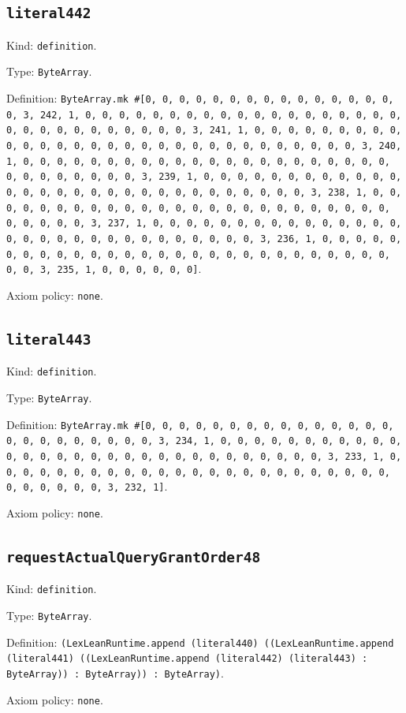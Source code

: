 \documentclass[11pt]{article}
\begin{document}
\subsection*{\texttt{literal442}}
\noindent Kind: \texttt{definition}.\par
\noindent Type: \texttt{ByteArray}.\par
\noindent Definition: \texttt{ByteArray.mk \#[0, 0, 0, 0, 0, 0, 0, 0, 0, 0, 0, 0, 0, 0, 0, 0, 3, 242, 1, 0, 0, 0, 0, 0, 0, 0, 0, 0, 0, 0, 0, 0, 0, 0, 0, 0, 0, 0, 0, 0, 0, 0, 0, 0, 0, 0, 0, 0, 0, 3, 241, 1, 0, 0, 0, 0, 0, 0, 0, 0, 0, 0, 0, 0, 0, 0, 0, 0, 0, 0, 0, 0, 0, 0, 0, 0, 0, 0, 0, 0, 0, 0, 3, 240, 1, 0, 0, 0, 0, 0, 0, 0, 0, 0, 0, 0, 0, 0, 0, 0, 0, 0, 0, 0, 0, 0, 0, 0, 0, 0, 0, 0, 0, 0, 0, 3, 239, 1, 0, 0, 0, 0, 0, 0, 0, 0, 0, 0, 0, 0, 0, 0, 0, 0, 0, 0, 0, 0, 0, 0, 0, 0, 0, 0, 0, 0, 0, 0, 3, 238, 1, 0, 0, 0, 0, 0, 0, 0, 0, 0, 0, 0, 0, 0, 0, 0, 0, 0, 0, 0, 0, 0, 0, 0, 0, 0, 0, 0, 0, 0, 0, 3, 237, 1, 0, 0, 0, 0, 0, 0, 0, 0, 0, 0, 0, 0, 0, 0, 0, 0, 0, 0, 0, 0, 0, 0, 0, 0, 0, 0, 0, 0, 0, 0, 3, 236, 1, 0, 0, 0, 0, 0, 0, 0, 0, 0, 0, 0, 0, 0, 0, 0, 0, 0, 0, 0, 0, 0, 0, 0, 0, 0, 0, 0, 0, 0, 0, 3, 235, 1, 0, 0, 0, 0, 0, 0]}.\par
\noindent Axiom policy: \texttt{none}.\par
\subsection*{\texttt{literal443}}
\noindent Kind: \texttt{definition}.\par
\noindent Type: \texttt{ByteArray}.\par
\noindent Definition: \texttt{ByteArray.mk \#[0, 0, 0, 0, 0, 0, 0, 0, 0, 0, 0, 0, 0, 0, 0, 0, 0, 0, 0, 0, 0, 0, 0, 0, 3, 234, 1, 0, 0, 0, 0, 0, 0, 0, 0, 0, 0, 0, 0, 0, 0, 0, 0, 0, 0, 0, 0, 0, 0, 0, 0, 0, 0, 0, 0, 0, 0, 3, 233, 1, 0, 0, 0, 0, 0, 0, 0, 0, 0, 0, 0, 0, 0, 0, 0, 0, 0, 0, 0, 0, 0, 0, 0, 0, 0, 0, 0, 0, 0, 0, 3, 232, 1]}.\par
\noindent Axiom policy: \texttt{none}.\par
\subsection*{\texttt{requestActualQueryGrantOrder48}}
\noindent Kind: \texttt{definition}.\par
\noindent Type: \texttt{ByteArray}.\par
\noindent Definition: \texttt{(LexLeanRuntime.append (literal440) ((LexLeanRuntime.append (literal441) ((LexLeanRuntime.append (literal442) (literal443) : ByteArray)) : ByteArray)) : ByteArray)}.\par
\noindent Axiom policy: \texttt{none}.\par
\end{document}
